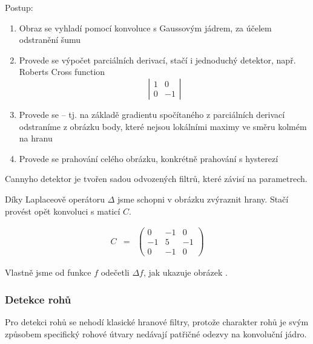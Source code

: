 \begin{enumerate}
Postup:

\begin{enumerate} 
\item Obraz se vyhladí pomocí konvoluce s Gaussovým jádrem, za účelem odstranění šumu
\item Provede se výpočet parciálních derivací, stačí i jednoduchý detektor, např. Roberts Cross function
$$\left|\begin{array}{cc}1&0\\0&-1\end{array}\right|$$
\item Provede se  -- tj. na základě gradientu spočítaného z parciálních derivací odstraníme
z obrázku body, které nejsou lokálními maximy ve směru kolmém na hranu
\item Provede se prahování celého obrázku, konkrétně prahování s hysterezí
\end{enumerate}

\end{enumerate}



Cannyho detektor je tvořen sadou odvozených filtrů, které závisí na parametrech.

Díky Laplaceově operátoru $\Delta$ jsme schopni v obrázku zvýraznit hrany. 
Stačí provést opět konvoluci s maticí $C$.

\begin{eqnarray}
C&=&\left(\begin{array}{ccc}0&-1&0\\-1&5&-1\\0&-1&0\end{array}\right)
\end{eqnarray}

Vlastně jsme od funkce $f$ odečetli $\Delta f$, jak ukazuje obrázek .


\subsubsection{Detekce rohů}
Pro detekci rohů se nehodí klasické hranové filtry, protože charakter rohů je svým způsobem
specifický rohové útvary nedávají patřičné odezvy na konvoluční jádro.


